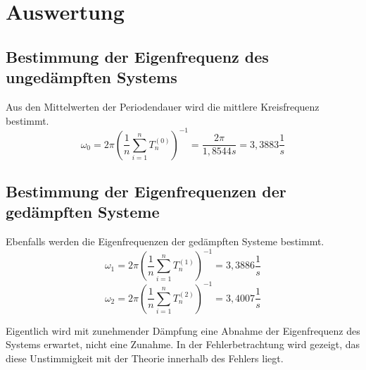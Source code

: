 \documentclass[12pt,a4paper,]{scrreprt}
\begin{document}
\chapter{Auswertung}

	\section{Bestimmung der Eigenfrequenz des ungedämpften Systems}
    	Aus den Mittelwerten der Periodendauer wird die mittlere Kreisfrequenz bestimmt.
    	\begin{equation}
    		\omega_0 = 2 \pi \left( \frac{1}{n} \sum_{i=1}^n T_n^{(0)} \right)^{-1} = \frac{2\pi}{1,8544s}=  3,3883 \frac{1}{s}
    	\end{equation}
        
	\section{Bestimmung der Eigenfrequenzen der gedämpften Systeme}
    Ebenfalls werden die Eigenfrequenzen der gedämpften Systeme bestimmt.
        \begin{equation}
    		\omega_1 = 2 \pi \left( \frac{1}{n} \sum_{i=1}^n T_n^{(1)} \right)^{-1} = 3,3886 \frac{1}{s}
    	\end{equation}
        \begin{equation}
    		\omega_2 = 2 \pi \left( \frac{1}{n} \sum_{i=1}^n T_n^{(2)} \right)^{-1} = 3,4007 \frac{1}{s} 
    	\end{equation}
    
        Eigentlich wird mit zunehmender Dämpfung eine Abnahme der Eigenfrequenz des Systems erwartet, nicht eine Zunahme. In der Fehlerbetrachtung wird gezeigt, das diese Unstimmigkeit mit der Theorie innerhalb des Fehlers liegt.
\end{document}
